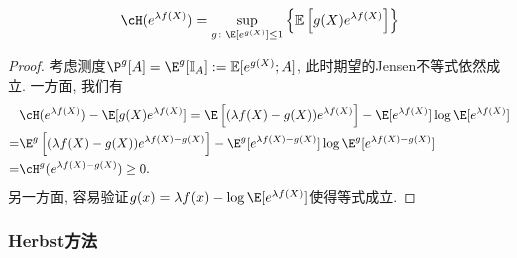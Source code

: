 \begin{theorem}[熵的变分表示]\label{thm:VariationalRepresentationForEntropy}
	\begin{equation}\label{eq:VariationalRepresentationForEntropy}
		\cH(e^{\lambda f(X)})
		= \sup_{g \colon \E [e^{g(X)}] \leq 1} \left\{ \mathbb{E} \left[g(X) e^{\lambda f(X)} \right] \right\}
	\end{equation}
\end{theorem}
\begin{proof}
	考虑测度$\P^g[A] = \E^g [\mathbb{I}_A] := \mathbb{E}[e^{g(X)}; A]$, 此时期望的Jensen不等式依然成立. 
	一方面, 我们有
	\begin{align*}
		&\cH(e^{\lambda f(X)}) - \E[g(X) e^{\lambda f(X)}]
		= \E \left[ (\lambda f(X) - g(X)) e^{\lambda f(X)} \right] - \E[ e^{\lambda f(X)}] \log \E[ e^{\lambda f(X)}] \\
		=& \E^g  \left[ (\lambda f(X) - g(X)) e^{\lambda f(X) - g(X)} \right] - \E^g[ e^{\lambda f(X) - g(X)}] \log \E^g[ e^{\lambda f(X) - g(X)}] \\
		=& \cH^g(e^{\lambda f(X) - g(X)}) \geq 0. 
	\end{align*}
	另一方面, 容易验证$g(x) = \lambda f(x) - \log \E[e^{\lambda f(X)}]$使得等式成立. 
\end{proof}

\subsubsection{Herbst方法}

